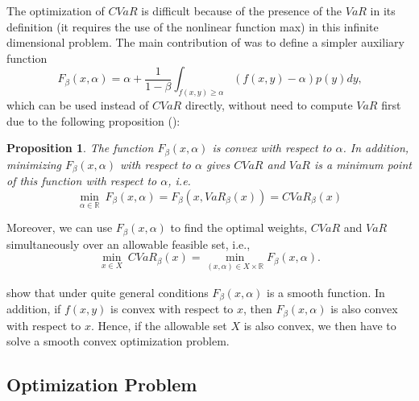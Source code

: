 \documentclass[a4paper,12pt]{report}
\newtheorem{proposition}{Proposition}
\begin{document}
\begin{refsection}
The optimization of $CVaR$ is difficult because of the presence of the $VaR$
in its definition (it requires the use of the nonlinear function max) in
this infinite dimensional problem. The main contribution of \citet*{%
	rockafellar2000} was to define a simpler auxiliary function
\begin{equation}
F_{\beta }\left( x,\alpha \right) = \alpha +\frac{1}{1-\beta }%
\int_{f(x,y)\geq \alpha }\left( f(x,y)-\alpha \right) p(y)dy\text{,}
\label{six}
\end{equation}%
which can be used instead of $CVaR$ directly, without need to compute $VaR$
first due to the following proposition (\citet*{pflug2000}): \bigskip

\begin{proposition}
	The function $F_{\beta }\left( x,\alpha \right) $ is convex with respect to $%
	\alpha $. In addition, minimizing $F_{\beta }\left( x,\alpha \right) $ with
	respect to $\alpha $ gives $CVaR$ and $VaR$ is a minimum point of this
	function with respect to $\alpha $, i.e.
	\begin{equation}
	\underset{\alpha \in
		\mathbb{R}
	}{\min }~F_{\beta }\left( x,\alpha \right) =F_{\beta }\left( x,VaR_{\beta
	}\left( x\right) \right) =CVaR_{\beta }(x)  \label{seven}
	\end{equation}
\end{proposition}

Moreover, we can use $F_{\beta }\left( x,\alpha \right) $ to find the optimal weights, $CVaR$ and
$VaR$ simultaneously over an allowable feasible set, i.e.,
\begin{equation}
\underset{x\in X}{\min }~CVaR_{\beta }(x)=\underset{}{\underset{\left(
		x,\alpha \right) \in X\times
		\mathbb{R}
	}{\min }F_{\beta }\left( x,\alpha \right) }.  \label{eight}
\end{equation}

\citet*{pflug2000} show that under quite general conditions $F_{\beta
}\left( x,\alpha \right) $ is a smooth function. In addition, if $f(x,y)$ is
convex with respect to $x$, then $F_{\beta }\left( x,\alpha \right) $ is
also convex with respect to $x$. Hence, if the allowable set $X$ is also
convex, we then have to solve a smooth convex optimization problem.

\vspace{0.6cm}

\subsection{Optimization Problem}


\end{refsection}
\end{document}
